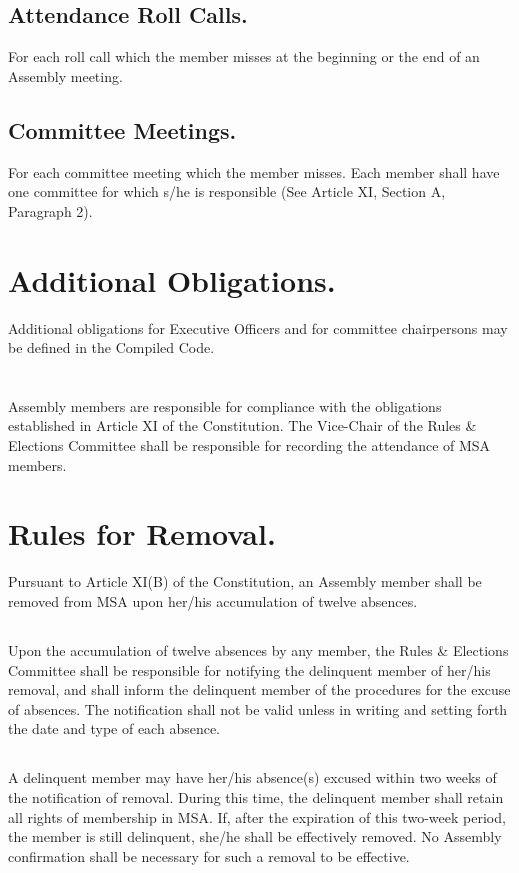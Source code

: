 \documentclass{rules}
\begin{document}
\subsection{Attendance Roll Calls.}
For each roll call which the member misses at the beginning or the end of an Assembly meeting.
\subsection{Committee Meetings.}
For each committee meeting which the member misses. Each member shall have one committee for which s/he is responsible (See Article XI, Section A, Paragraph 2).

\section{Additional Obligations.}
Additional obligations for Executive Officers and for committee chairpersons may be defined in the Compiled Code.


\section{}
Assembly members are responsible for compliance with the obligations established in Article XI of the Constitution.  The Vice-Chair of the Rules \& Elections Committee shall be responsible for recording the attendance of MSA members.

\section{Rules for Removal.}
Pursuant to Article XI(B) of the Constitution, an Assembly member shall be removed from MSA upon her/his accumulation of twelve absences.
\subsection{}
Upon the accumulation of twelve absences by any member, the Rules \& Elections Committee shall be responsible for notifying the delinquent member of her/his removal, and shall inform the delinquent member of the procedures for the excuse of absences.  The notification shall not be valid unless in writing and setting forth the date and type of each absence.
\subsection{}
A delinquent member may have her/his absence(s) excused within two weeks of the notification of removal.  During this time, the delinquent member shall retain all rights of membership in MSA.  If, after the expiration of this two-week period, the member is still delinquent, she/he shall be effectively removed.  No Assembly confirmation shall be necessary for such a removal to be effective.
\end{document}

